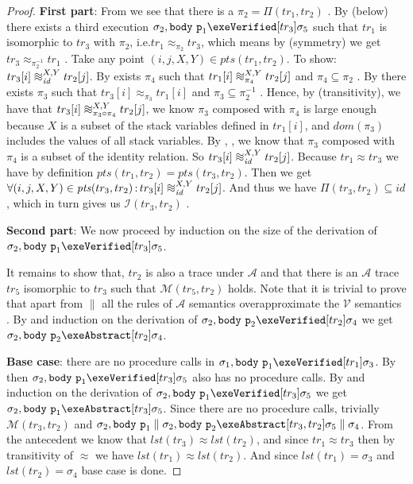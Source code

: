 \documentclass[runningheads,a4paper]{llncs}
\makeatletter
\newcommand*{\ie}{i.e.\@\xspace}
\DeclareMathOperator{\suchthat}{:}
\newcommand*{\domain}[1]{\mathit{dom}(#1)}
\newcommand*{\identity}[0]{\mathit{id}}
\newcommand*{\last}[1]{\mathit{lst}(#1)}
\newcommand{\tr}{tr}
\newcommand*\iso{\approx}
\newcommand*{\parcomp}{\parallel}
\newcommand*\Asemantics{\mathcal{A}}
\newcommand*\asemantics{$\Asemantics$ semantics}
\newcommand*\Vsemantics{\mathcal{V}}
\newcommand*\vsemantics{$\Vsemantics$ semantics}
\newcommand*{\body}{\mathtt{body}}
\newcommand*{\fun}{\texttt{p}}
\newcommand*{\wiso}{%
  \mathrel{\vcenter{\offinterlineskip
  \hbox{$\sim$}\vskip-.35ex\hbox{$\sim$}\vskip-.35ex\hbox{$\sim$}}}}
\newcommand*{\myIsoCompatibleStates}{\mathit{pts}}
\newcommand*{\isoR}{\mathcal{I}}
\newcommand*{\mutR}{\mathcal{M}}
\newcommand*{\store}{\sigma}
\makeatother
\begin{document}
\begin{proof}
\textbf{First part}: From  we see that there is a $\pi_2=\Pi(\tr_1,\tr_2)$ \tagone{}.
%
By  (below) there exists a third execution $\store_2,\body~\fun_1\exeVerified[\tr_3]\store_5$ such that $\tr_1$ is isomorphic to $\tr_3$ with $\pi_2$, \ie $\tr_1\iso_{\pi_2}\tr_3$, which means by  (symmetry) we get $\tr_3\iso_{\pi^{-1}_2}\tr_1$ \tagtwo{}.
%
Take any point $(i,j,X,Y) \in \myIsoCompatibleStates(tr_1, tr_2)$. To show: $\tr_3[i] \wiso_{\identity}^{X,Y} \tr_2[j]$.
%
By \tagone{} exists $\pi_4$ such that $\tr_1[i] \wiso_{\pi_4}^{X,Y} \tr_2[j]$ and $\pi_4 \subseteq \pi_2$ \tagfour{}.
%
By \tagtwo{} there exists $\pi_3$ such that $\tr_3[i] \iso_{\pi_3} \tr_1[i]$ and $\pi_3 \subseteq \pi_2^{-1}$ \tagthree{}.
%
Hence, by  (transitivity), we have that $\tr_3[i] \wiso_{\pi_3 \circ \pi_4}^{X,Y} \tr_2[j]$, we know $\pi_3$ composed with $\pi_4$ is large enough because $X$ is a subset of the stack variables defined in $\tr_1[i]$, and $\domain{\pi_3}$ includes the values of all stack variables.
%
By \tagthree{}, \tagfour{}, we know that $\pi_3$ composed with $\pi_4$ is a subset of the identity relation. So $\tr_3[i] \wiso_{\identity}^{X,Y} \tr_2[j]$.
%
Because $\tr_1\iso\tr_3$ we have by definition $\myIsoCompatibleStates(tr_1, tr_2)=\myIsoCompatibleStates(tr_3, tr_2)$. Then we get $\forall (i,j,X,Y) \in \myIsoCompatibleStates(tr_3, tr_2) \suchthat \tr_3[i] \wiso_{\identity}^{X,Y} \tr_2[j]$. And thus we have $\Pi(\tr_3,\tr_2) \subseteq \identity$, which in turn gives us $\isoR(\tr_3,\tr_2)$ \tagfive{}.

\noindent\textbf{Second part}: We now proceed by induction on the size of the derivation of $\store_2,\body~\fun_1 \exeVerified[\tr_3] \store_5$.

It remains to show that, $\tr_2$ is also a trace under $\Asemantics$ and that there is an $\Asemantics$ trace $\tr_5$ isomorphic to $\tr_3$ such that $\mutR(\tr_5,\tr_2)$ holds.
%
Note that it is trivial to prove that apart from $\parcomp$ all the rules of \asemantics{} overapproximate the \vsemantics{} \sublemmaone{}.
%
By \sublemmaone{} and induction on the derivation of $\store_2,\body~\fun_2\exeVerified[\tr_2]\store_4$ we get $\store_2,\body~\fun_2\exeAbstract[\tr_2]\store_4$.

\noindent\textbf{Base case}: there are no procedure calls in $\store_1,\body~\fun_1\exeVerified[\tr_1]\store_3$.
%
By  then $\store_2,\body~\fun_1\exeVerified[\tr_3]\store_5$ also has no procedure calls.
%
By \sublemmaone{} and induction on the derivation of $\store_2,\body~\fun_1\exeVerified[\tr_3]\store_5$ we get $\store_2,\body~\fun_1\exeAbstract[\tr_3]\store_5$.
%
Since there are no procedure calls, trivially $\mutR(\tr_3,\tr_2)$  and $\store_2,\body~\fun_1 \parcomp \store_2,\body~\fun_2 \exeAbstract[\tr_3,\tr_2] \store_5 \parcomp \store_4$.
%
From the antecedent we know that $\last{\tr_3}\iso\last{\tr_2}$, and since $\tr_1\iso\tr_3$ then by transitivity of $\iso$ we have $\last{\tr_1}\iso\last{\tr_2}$. And since $\last{\tr_1}=\store_3$ and $\last{\tr_2}=\store_4$ base case is done.


\end{proof}
\end{document}
